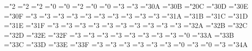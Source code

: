 \mathchardef\boxdot="2 \mathchardef\boxplus="2
\mathchardef\boxtimes="2 \mathchardef\square="0
\mathchardef\blacksquare="0
\mathchardef\centerdot="2 \mathchardef\lozenge="0
\mathchardef\blacklozenge="0
\mathchardef\circlearrowright="3
\mathchardef\circlearrowleft="3
\mathchardef\rightleftharpoons="3\msa@0A
\mathchardef\leftrightharpoons="3\msa@0B
\mathchardef\boxminus="2\msa@0C \mathchardef\Vdash="3\msa@0D
\mathchardef\Vvdash="3\msa@0E \mathchardef\vDash="3\msa@0F
\mathchardef\twoheadrightarrow="3
\mathchardef\twoheadleftarrow="3
\mathchardef\leftleftarrows="3
\mathchardef\rightrightarrows="3
\mathchardef\upuparrows="3
\mathchardef\downdownarrows="3
\mathchardef\upharpoonright="3
\let\restriction=\upharpoonright
\mathchardef\downharpoonright="3
\mathchardef\upharpoonleft="3
\mathchardef\downharpoonleft="3
\mathchardef\rightarrowtail="3\msa@1A
\mathchardef\leftarrowtail="3\msa@1B
\mathchardef\leftrightarrows="3\msa@1C
\mathchardef\rightleftarrows="3\msa@1D \mathchardef\Lsh="3\msa@1E
\mathchardef\Rsh="3\msa@1F \mathchardef\rightsquigarrow="3
\mathchardef\leftrightsquigarrow="3
\mathchardef\looparrowleft="3
\mathchardef\looparrowright="3
\mathchardef\circeq="3 \mathchardef\succsim="3
\mathchardef\gtrsim="3 \mathchardef\gtrapprox="3
\mathchardef\multimap="3 \mathchardef\therefore="3
\mathchardef\because="3\msa@2A \mathchardef\doteqdot="3\msa@2B
\let\Doteq=\doteqdot
\mathchardef\triangleq="3\msa@2C \mathchardef\precsim="3\msa@2D
\mathchardef\lesssim="3\msa@2E \mathchardef\lessapprox="3\msa@2F
\mathchardef\eqslantless="3
\mathchardef\eqslantgtr="3
\mathchardef\curlyeqprec="3
\mathchardef\curlyeqsucc="3
\mathchardef\preccurlyeq="3 \mathchardef\leqq="3
\mathchardef\leqslant="3 \mathchardef\lessgtr="3
\mathchardef\backprime="0
\mathchardef\risingdotseq="3\msa@3A
\mathchardef\fallingdotseq="3\msa@3B
\mathchardef\succcurlyeq="3\msa@3C \mathchardef\geqq="3\msa@3D
\mathchardef\geqslant="3\msa@3E \mathchardef\gtrless="3\msa@3F
\mathchardef\sqsubset="3 \mathchardef\sqsupset="3
\mathchardef\vartriangleright="3
\mathchardef\vartriangleleft="3
\mathchardef\trianglerighteq="3
\mathchardef\trianglelefteq="3
\mathchardef\bigstar="0 \mathchardef\between="3
\mathchardef\blacktriangledown="0
\mathchardef\blacktriangleright="3
\mathchardef\blacktriangleleft="3\msa@4A
